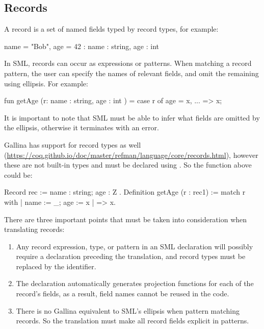 \documentclass[a4paper,11pt]{article}
\begin{document}
\subsection{Records}
\label{sec:records}

A record is a set of named fields typed by record types, for example:

\begin{sml}
{name = "Bob", age = 42} : {name : string, age : int }
\end{sml}

In SML, records can occur as expressions or patterns. When matching a
record pattern, the user can specify the names of relevant fields, and
omit the remaining using ellipsis. For example:

\begin{sml}
fun getAge (r: {name : string, age : int }) = case r of
  {age = x, ...} => x;
\end{sml}

It is important to note that SML must be able to infer what fields are
omitted by the ellipsis, otherwise it terminates with an error.

Gallina has support for record types as well
(\url{https://coq.github.io/doc/master/refman/language/core/records.html}),
however these are not built-in types and must be declared using
. So the  function above could be:

\begin{coq}
Record rec := { name : string; age : Z }.
Definition getAge (r : rec1) := match r with 
  {| name := _; age := x |} => x.
\end{coq}

There are three important points that must be taken into consideration
when translating records:

\begin{enumerate}
  \item Any record expression, type, or pattern in an SML declaration
  will possibly require a  declaration preceding the
  translation, and record types must be replaced by the 
  identifier.

  \item The  declaration automatically generates
  projection functions for each of the record's fields, as a result,
  field names cannot be reused in the code.

  \item There is no Gallina equivalent to SML's ellipsis when pattern
  matching records. So the translation must make all record fields
  explicit in patterns.
\end{enumerate}
\end{document}
